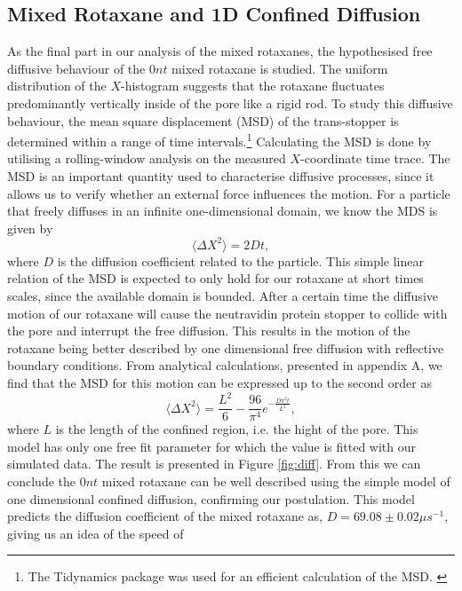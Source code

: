 \subsection{Mixed Rotaxane and 1D Confined Diffusion}

As the final part in our analysis of the mixed rotaxanes, the hypothesised free diffusive
behaviour of the $0nt$ mixed rotaxane is studied. The uniform distribution of the
$X$-histogram suggests that the rotaxane fluctuates predominantly vertically inside of
the pore like a rigid rod.  To study this diffusive behaviour, the mean square
displacement (MSD) of the trans-stopper is determined within a range of time
intervals.\footnote{The Tidynamics package was used for an efficient calculation of the
MSD. \cite{deBuyl2018}}
Calculating the MSD is done by utilising a rolling-window
analysis on the measured $X$-coordinate time trace. The MSD is an important quantity used
to
characterise diffusive processes, since it allows us to verify whether an external force
influences the motion. For a particle that freely diffuses in an infinite one-dimensional
domain, we know the MDS is given by
\begin{equation}
  \langle \Delta X^2 \rangle = 2 D t,
\end{equation}
where $D$ is the diffusion coefficient related to the particle. This simple linear
relation of the MSD is expected to only hold for our rotaxane at short times scales,
since the available domain is bounded. After a certain time the diffusive
motion of our rotaxane will cause the neutravidin protein stopper to collide with the
pore and interrupt the free diffusion. This results in the motion of the rotaxane being
better described by one dimensional free diffusion with reflective boundary conditions.
From analytical calculations, presented in appendix A, we find
that the MSD for this motion can be expressed up to the second order as
\begin{equation}
\langle \Delta X^2 \rangle = \frac{L^2}{6} - \frac{96}{\pi^4} e^{-\frac{D \pi^2t
}{L^2}},
\end{equation}
where $L$ is the length of the confined region, i.e. the hight of the pore. This model
has
only one free fit parameter for which the value is fitted with our simulated data. The
result is presented in Figure \ref{fig:diff}.  From this we can conclude the $0nt$ mixed
rotaxane can be well described using the simple model of one dimensional confined
diffusion, confirming our postulation. This model predicts the diffusion coefficient of
the mixed rotaxane as, $D = 69.08 \pm 0.02 \mu s^{-1}$, giving us an idea of the speed of

